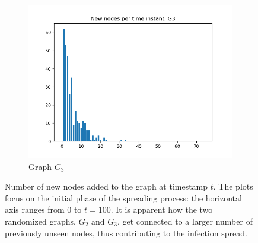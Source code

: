 \documentclass[letterpaper]{article}
\begin{document}
\begin{figure}
\begin{subfigure}[b]{0.32\textwidth}
        \includegraphics[width=\textwidth]{img/newNodesG3.png}
        \caption{Graph \(G_3\)}
	    \label{fig:degree_distribution_G3}
    \end{subfigure}
    \caption{\small{Number of new nodes added to the graph at timestamp \(t\). 
    The plots focus on the initial phase of the spreading process: the horizontal axis ranges from \(0\) to \(t=100\). It is apparent how the two randomized graphs, \(G_2\) and \(G_3\), get connected to a larger number of previously unseen nodes, thus contributing to the infection spread.}}
    \label{fig:degree_distribution}
\end{figure}
\end{document}
